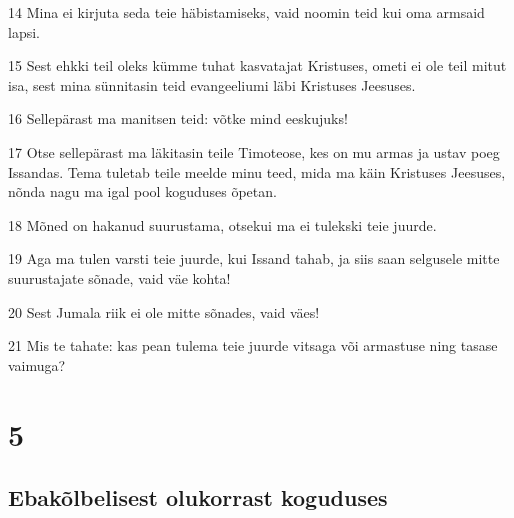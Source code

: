 \par 14 Mina ei kirjuta seda teie häbistamiseks, vaid noomin teid kui oma armsaid lapsi.
\par 15 Sest ehkki teil oleks kümme tuhat kasvatajat Kristuses, ometi ei ole teil mitut isa, sest mina sünnitasin teid evangeeliumi läbi Kristuses Jeesuses.
\par 16 Sellepärast ma manitsen teid: võtke mind eeskujuks!
\par 17 Otse sellepärast ma läkitasin teile Timoteose, kes on mu armas ja ustav poeg Issandas. Tema tuletab teile meelde minu teed, mida ma käin Kristuses Jeesuses, nõnda nagu ma igal pool koguduses õpetan.
\par 18 Mõned on hakanud suurustama, otsekui ma ei tulekski teie juurde.
\par 19 Aga ma tulen varsti teie juurde, kui Issand tahab, ja siis saan selgusele mitte suurustajate sõnade, vaid väe kohta!
\par 20 Sest Jumala riik ei ole mitte sõnades, vaid väes!
\par 21 Mis te tahate: kas pean tulema teie juurde vitsaga või armastuse ning tasase vaimuga?


\chapter{5}

\section*{Ebakõlbelisest olukorrast koguduses}

